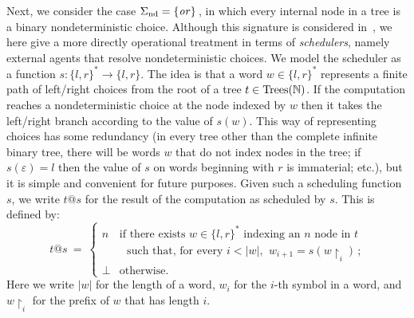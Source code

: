 Next, we consider the case $\Sigma_{\text{nd}} = \{\operatorname{\mathit{or}}\}\,$, in which every internal node in a tree is a binary nondeterministic choice.
Although this signature is considered in~\cite{gom}, we here give a more directly operational treatment in terms of 
 \emph{schedulers}, namely external agents that resolve nondeterministic choices.
We model the scheduler as a 
function $s: \{l,r\}^* \to \{l,r\}$. The idea is that a word $w \in \{l,r\}^*$ represents a finite path of left/right choices from the root of a 
tree $t \in \textnormal{Trees}(\mathbb{N})$. If the computation reaches a nondeterministic choice at the node indexed by 
$w$ then it takes the left/right branch according to the value of $s(w)$. This way of representing choices has some redundancy
(in every tree other than the complete infinite binary tree, there will be words $w$ that do not index nodes in the tree; if $s(\varepsilon) = l$ then the value of $s$ on words beginning with $r$ is immaterial; etc.), but it is simple and convenient for future purposes. 
Given such a scheduling function $s$, we write $t@s$ for the result of the computation as scheduled by $s$. This is defined by:
\[
t@s ~ = ~ \begin{cases} 
 n & \text{if there exists $w \in \{l,r\}^*$ indexing an $n$ node in $t$} \\
    & ~~~\text{such that, for every $i < |w|$, $~w_{i+1} = s(w\!\restriction_i)\,$;} \\
  \bot & \text{otherwise.}
 \end{cases}
\]
Here we write $|w|$ for the length of a word, $w_i$ for the $i$-th symbol in a word, and $w \!\restriction_i$ for the prefix of $w$ that has length $i$.

